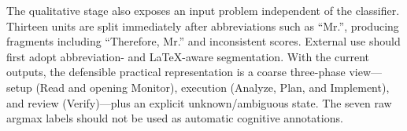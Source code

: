 The qualitative stage also exposes an input problem independent of the
classifier.  Thirteen units are split immediately after abbreviations such as
``Mr.'', producing fragments including ``Therefore, Mr.'' and inconsistent
scores.  External use should first adopt abbreviation- and LaTeX-aware
segmentation.  With the current outputs, the defensible practical
representation is a coarse three-phase view---setup (Read and opening
Monitor), execution (Analyze, Plan, and Implement), and review (Verify)---plus
an explicit unknown/ambiguous state.  The seven raw argmax labels should not
be used as automatic cognitive annotations.

